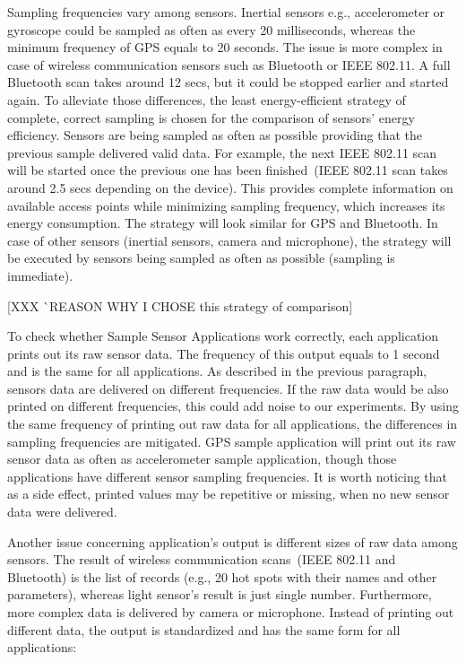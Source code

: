 Sampling frequencies vary among sensors. Inertial sensors e.g., accelerometer or gyroscope could be sampled as often as every 20 milliseconds, whereas the minimum frequency of GPS equals to 20 seconds. The issue is more complex in case of wireless communication sensors such as Bluetooth or IEEE 802.11. A full Bluetooth scan takes around 12 secs, but it could be stopped earlier and started again. To alleviate those differences, the least energy-efficient strategy of complete, correct sampling is chosen for the comparison of sensors' energy efficiency. Sensors are being sampled as often as possible providing that the previous sample delivered valid data. For example, the next IEEE 802.11 scan will be started once the previous one has been finished\ (IEEE 802.11 scan takes around 2.5 secs depending on the device). This provides complete information on available access points while minimizing sampling frequency, which increases its energy consumption. The strategy will look similar for GPS and Bluetooth. In case of other sensors (inertial sensors, camera and microphone), the strategy will be executed by sensors being sampled as often as possible (sampling is immediate). 

[XXX ^^ REASON WHY I CHOSE this strategy of comparison]

To check whether Sample Sensor Applications work correctly, each application prints out its raw sensor data. The frequency of this output equals to 1 second and is the same for all applications. As described in the previous paragraph, sensors data are delivered on different frequencies. If the raw data would be also printed on different frequencies, this could add noise to our experiments. By using the same frequency of printing out raw data for all applications, the differences in sampling frequencies are mitigated. GPS sample application will print out its raw sensor data as often as accelerometer sample application, though those applications have different sensor sampling frequencies. It is worth noticing that as a side effect, printed values may be repetitive or missing, when no new sensor data were delivered. 

Another issue concerning application's output is different sizes of raw data among sensors. The result of wireless communication scans\ (IEEE 802.11 and Bluetooth) is the list of records (e.g., 20 hot spots with their names and other parameters), whereas light sensor's result  is just single number. Furthermore, more complex data is delivered by camera or microphone. Instead of printing out different data, the output is standardized and has the same form for all applications:

